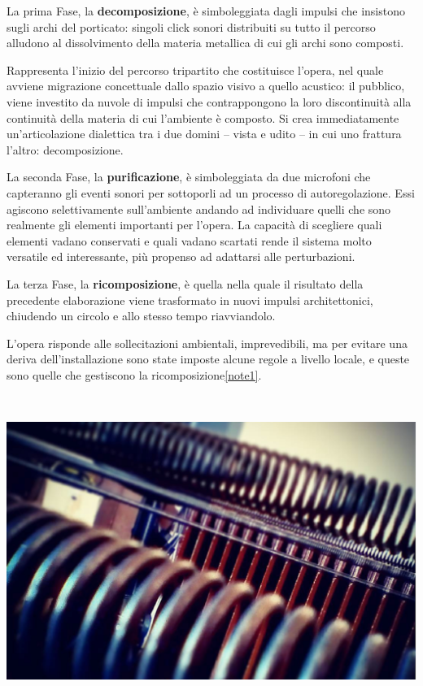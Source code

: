 \documentclass[
	a0,
	portrait
	]{a0poster}
\begin{document}
\begin{multicols}{4}
La prima Fase, la \textbf{decomposizione}, è simboleggiata dagli impulsi che insistono sugli archi del porticato: singoli click sonori distribuiti su tutto il percorso alludono al dissolvimento della materia metallica di cui gli archi sono composti.

Rappresenta l’inizio del percorso tripartito che costituisce l’opera, nel quale avviene migrazione concettuale dallo spazio visivo a quello acustico: il pubblico, viene investito da nuvole di impulsi che contrappongono la loro discontinuità alla continuità della materia di cui l'ambiente è composto. Si crea immediatamente un’articolazione dialettica tra i due domini – vista e udito – in cui uno frattura l’altro: decomposizione.

La seconda Fase, la \textbf{purificazione}, è simboleggiata da due microfoni che capteranno gli eventi sonori per sottoporli ad un processo di autoregolazione. Essi agiscono selettivamente sull’ambiente andando ad individuare quelli che sono realmente gli elementi importanti per l’opera. La capacità di scegliere quali elementi vadano conservati e quali vadano scartati rende il sistema molto versatile ed interessante, più propenso ad adattarsi alle perturbazioni.

La terza Fase, la \textbf{ricomposizione}, è quella nella quale il risultato della precedente elaborazione viene trasformato in nuovi impulsi architettonici, chiudendo un circolo e allo stesso tempo riavviandolo.

L’opera risponde alle sollecitazioni ambientali, imprevedibili, ma per evitare una deriva dell’installazione sono state imposte alcune regole a livello locale, e queste sono quelle che gestiscono la ricomposizione\cref{note1}.

\vfill

~

\columnbreak


\begin{center}
\includegraphics[width=1.\linewidth]{spire}
\end{center}


\end{multicols}
\end{document}
